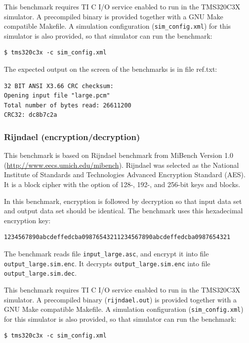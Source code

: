 This benchmark requires TI C I/O service enabled to run in the TMS320C3X simulator.
A precompiled binary is provided together with a GNU Make compatible Makefile.
A simulation configuration (\texttt{sim\_config.xml}) for this simulator is also provided, so that simulator can run the benchmark:

\begin{verbatim}
$ tms320c3x -c sim_config.xml
\end{verbatim}

\noindent The expected output on the screen of the benchmarks is in file ref.txt:

\begin{verbatim}
32 BIT ANSI X3.66 CRC checksum:
Opening input file "large.pcm"
Total number of bytes read: 26611200
CRC32: dc8b7c2a
\end{verbatim}

\subsubsection{Rijndael (encryption/decryption)}

This benchmark is based on Rijndael benchmark from MiBench Version 1.0 (\url{http://www.eecs.umich.edu/mibench}).
Rijndael was selected as the National Institute of Standards and Technologies Advanced Encryption Standard (AES).
It is a block cipher with the option of 128-, 192-, and 256-bit keys and blocks.

In this benchmark, encryption is followed by decryption so that input data set and output data set should be identical.
The benchmark uses this hexadecimal encryption key:
\begin{verbatim}
1234567890abcdeffedcba09876543211234567890abcdeffedcba0987654321
\end{verbatim}
The benchmark reads file \texttt{input\_large.asc}, and encrypt it into file \texttt{output\_large.sim.enc}.
It decrypts \texttt{output\_large.sim.enc} into file \texttt{output\_large.sim.dec}.

This benchmark requires TI C I/O service enabled to run in the TMS320C3X simulator.
A precompiled binary (\texttt{rijndael.out}) is provided together with a GNU Make compatible Makefile.
A simulation configuration (\texttt{sim\_config.xml}) for this simulator is also provided, so that simulator can run the benchmark:

\begin{verbatim}
$ tms320c3x -c sim_config.xml
\end{verbatim}

